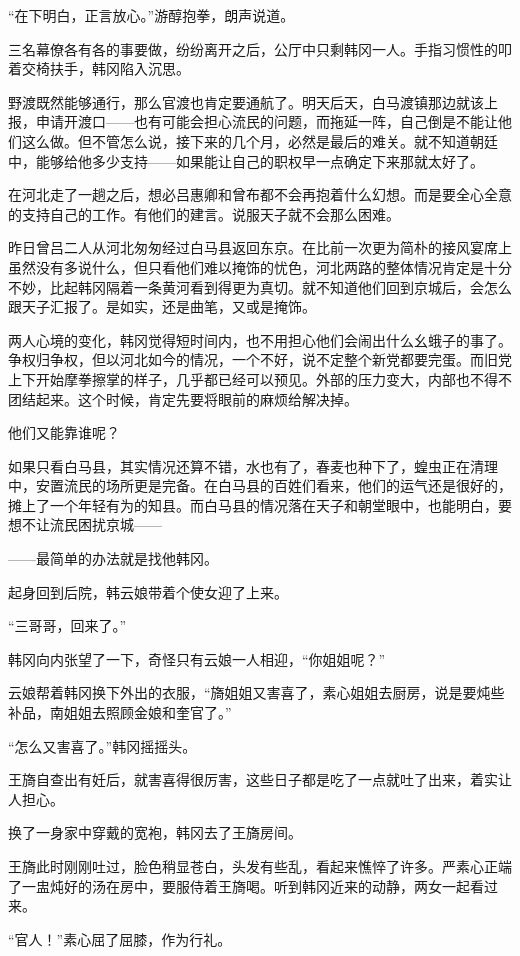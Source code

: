 “在下明白，正言放心。”游醇抱拳，朗声说道。

三名幕僚各有各的事要做，纷纷离开之后，公厅中只剩韩冈一人。手指习惯性的叩着交椅扶手，韩冈陷入沉思。

野渡既然能够通行，那么官渡也肯定要通航了。明天后天，白马渡镇那边就该上报，申请开渡口——也有可能会担心流民的问题，而拖延一阵，自己倒是不能让他们这么做。但不管怎么说，接下来的几个月，必然是最后的难关。就不知道朝廷中，能够给他多少支持——如果能让自己的职权早一点确定下来那就太好了。

在河北走了一趟之后，想必吕惠卿和曾布都不会再抱着什么幻想。而是要全心全意的支持自己的工作。有他们的建言。说服天子就不会那么困难。

昨日曾吕二人从河北匆匆经过白马县返回东京。在比前一次更为简朴的接风宴席上虽然没有多说什么，但只看他们难以掩饰的忧色，河北两路的整体情况肯定是十分不妙，比起韩冈隔着一条黄河看到得更为真切。就不知道他们回到京城后，会怎么跟天子汇报了。是如实，还是曲笔，又或是掩饰。

两人心境的变化，韩冈觉得短时间内，也不用担心他们会闹出什么幺蛾子的事了。争权归争权，但以河北如今的情况，一个不好，说不定整个新党都要完蛋。而旧党上下开始摩拳擦掌的样子，几乎都已经可以预见。外部的压力变大，内部也不得不团结起来。这个时候，肯定先要将眼前的麻烦给解决掉。

他们又能靠谁呢？

如果只看白马县，其实情况还算不错，水也有了，春麦也种下了，蝗虫正在清理中，安置流民的场所更是完备。在白马县的百姓们看来，他们的运气还是很好的，摊上了一个年轻有为的知县。而白马县的情况落在天子和朝堂眼中，也能明白，要想不让流民困扰京城——

——最简单的办法就是找他韩冈。

起身回到后院，韩云娘带着个使女迎了上来。

“三哥哥，回来了。”

韩冈向内张望了一下，奇怪只有云娘一人相迎，“你姐姐呢？”

云娘帮着韩冈换下外出的衣服，“旖姐姐又害喜了，素心姐姐去厨房，说是要炖些补品，南姐姐去照顾金娘和奎官了。”

“怎么又害喜了。”韩冈摇摇头。

王旖自查出有妊后，就害喜得很厉害，这些日子都是吃了一点就吐了出来，着实让人担心。

换了一身家中穿戴的宽袍，韩冈去了王旖房间。

王旖此时刚刚吐过，脸色稍显苍白，头发有些乱，看起来憔悴了许多。严素心正端了一盅炖好的汤在房中，要服侍着王旖喝。听到韩冈近来的动静，两女一起看过来。

“官人！”素心屈了屈膝，作为行礼。

